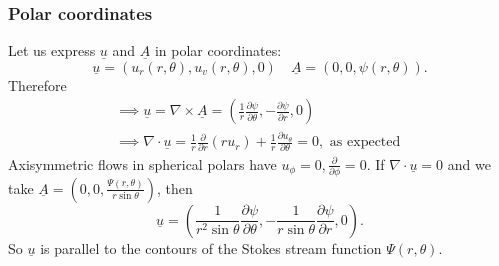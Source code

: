 \documentclass[a4paper]{scrartcl}
\renewcommand{\vec}[1]{\underline{#1}}
\begin{document}
\subsubsection{Polar coordinates}
Let us express $\vec{u}$ and $\vec{A}$ in polar coordinates: \[
\vec{u}=(u_{r}(r,\theta), u_{v}(r, \theta),0) \quad \vec{A}=(0,0,\psi (r,\theta))
.\] 
Therefore 
\begin{align*}
    \implies \vec{u}=\nabla \times \vec{A}=(\frac{1}{r} \frac{\partial \psi}{\partial \theta}, -\frac{\partial \psi}{\partial r},0)\\
    \implies \nabla \cdot \vec{u}= \frac{1}{r} \frac{\partial}{\partial r}(ru_{r})+\frac{1}{r} \frac{\partial u_{\theta}}{\partial \theta}=0, \text{ as expected } 
\end{align*}
Axisymmetric flows in spherical polars have $u_{\phi}=0, \frac{\partial }{\partial \phi}=0$. If $\nabla \cdot \vec{u}=0$ and we take $\vec{A}=(0,0, \frac{\Psi (r, \theta)}{r \sin \theta})$, then \[
\vec{u}=\left(\frac{1}{r^2 \sin \theta} \frac{\partial \psi}{\partial \theta}, -\frac{1}{r \sin \theta}\frac{\partial \psi}{\partial r},0 \right)
.\] So $\vec{u}$ is parallel to the contours of the Stokes stream function $\Psi (r,\theta)$.
\end{document}
